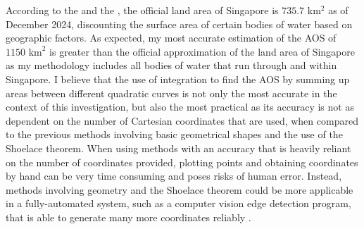 \documentclass[12pt]{article}
\begin{document}
According to the \cite{land_auth} and the \cite{dss}, the official land area of Singapore is $735.7$ km$^2$ as of December 2024, discounting the surface area of certain bodies of water based on geographic factors. As expected, my most accurate estimation of the AOS of $1150\text{ km}^2$ is greater than the official approximation of the land area of Singapore as my methodology includes all bodies of water that run through and within Singapore. I believe that the use of integration to find the AOS by summing up areas between different quadratic curves is not only the most accurate in the context of this investigation, but also the most practical as its accuracy is not as dependent on the number of Cartesian coordinates that are used, when compared to the previous methods involving basic geometrical shapes and the use of the Shoelace theorem. When using methods with an accuracy that is heavily reliant on the number of coordinates provided, plotting points and obtaining coordinates by hand can be very time consuming and poses risks of human error. Instead, methods involving geometry and the Shoelace theorem could be more applicable in a fully-automated system, such as a computer vision edge detection program, that is able to generate many more coordinates reliably \parencite{edge_detect}.

\newpage
\appendix
\appendixpage
\end{document}
